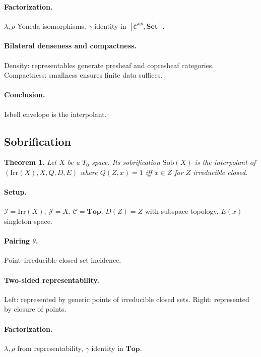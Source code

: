 \documentclass[11pt]{article}
\theoremstyle{plain}
\newtheorem{theorem}{Theorem}[section]
\theoremstyle{definition}
\theoremstyle{remark}
\begin{document}
\paragraph{Factorization.}
$\lambda,\rho$ Yoneda isomorphisms, $\gamma$ identity in $[\mathcal{C}^{op},\mathbf{Set}]$.

\paragraph{Bilateral denseness and compactness.}
Density: representables generate presheaf and copresheaf categories.  
Compactness: smallness ensures finite data suffices.

\paragraph{Conclusion.}
Isbell envelope is the interpolant.

\subsection{Sobrification}
\begin{theorem}
Let $X$ be a $T_{0}$ space. Its sobrification $\mathrm{Sob}(X)$ is the interpolant of $(\mathrm{Irr}(X),X,Q,D,E)$ where $Q(Z,x) = 1$ iff $x\in Z$ for $Z$ irreducible closed.
\end{theorem}

\paragraph{Setup.}
$\mathcal{I}=\mathrm{Irr}(X)$, $\mathcal{J}=X$. $\mathcal{C}=\mathbf{Top}$.  
$D(Z)=Z$ with subspace topology, $E(x)$ singleton space.

\paragraph{Pairing $\theta$.}
Point--irreducible-closed-set incidence.

\paragraph{Two-sided representability.}
Left: represented by generic points of irreducible closed sets.  
Right: represented by closure of points.

\paragraph{Factorization.}
$\lambda,\rho$ from representability, $\gamma$ identity in $\mathbf{Top}$.
\end{document}

